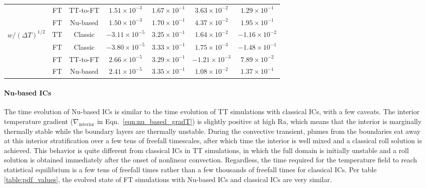\documentclass[aps, pre, onecolumn, nofootinbib, notitlepage, groupedaddress, amsfonts, amssymb, amsmath, longbibliography, superscriptaddress]{revtex4-1}
\newcommand{\grad}{\ensuremath{\nabla}}
\newcommand{\ea}[1]{{\color{red} #1}}
\begin{document}
\begin{table}[b!]
\begin{center}
\begin{tabular}{c c c c c c c}
						&	FT	& TT-to-FT	&	$1.51 \times 10^{-3}$	&	$1.67 \times 10^{-1}$	&	$3.63 \times 10^{-2}$	&	$1.29  \times 10^{-1}$ \\
						&	FT	& Nu-based	&	$1.50 \times 10^{-3}$	&	$1.70 \times 10^{-1}$	&	$4.37 \times 10^{-2}$	&	$1.95  \times 10^{-1}$ \\
\hline                                                                                                                    
$w/(\Delta T)^{1/2}$ 	&	TT	& Classic	&	$-3.11 \times 10^{-5}$	&	$3.25 \times 10^{-1}$	&	$1.64 \times 10^{-2}$	&	$-1.16 \times 10^{-2}$ \\
						&	FT	& Classic	&	$-3.80 \times 10^{-5}$	&	$3.33 \times 10^{-1}$	&	$1.75 \times 10^{-3}$	&	$-1.48 \times 10^{-1}$ \\
						&	FT	& TT-to-FT	&	$2.66  \times 10^{-5}$	&	$3.29 \times 10^{-1}$	&	$-1.21 \times 10^{-3}$	&	$7.89  \times 10^{-2}$ \\
						&	FT	& Nu-based	&	$2.41  \times 10^{-5}$	&	$3.35 \times 10^{-1}$	&	$1.08 \times 10^{-2}$	&	$1.37  \times 10^{-1}$ \\
\hline																	
\end{tabular}
\end{center}
\end{table}


\ea{
\paragraph{Nu-based ICs}
The time evolution of Nu-based ICs is similar to the time evolution of TT simulations with classical ICs, with a few caveats.
The interior temperature gradient ($\grad_{\text{interior}}$ in Eqn.~\ref{eqn:nu_based_gradT}) is slightly positive at high Ra, which means that the interior is marginally thermally stable while the boundary layers are thermally unstable.
During the convective transient, plumes from the boundaries eat away at this interior stratification over a few tens of freefall timescales, after which time the interior is well mixed and a classical roll solution is achieved.
This behavior is quite different from classical ICs in TT simulations, in which the full domain is initially unstable and a roll solution is obtained immediately after the onset of nonlinear convection.
Regardless, the time required for the temperature field to reach statistical equilibrium is a few tens of freefall times rather than a few thousands of freefall times for classical ICs.
Per table \ref{table:pdf_values}, the evolved state of FT simulations with Nu-based ICs and classical ICs are very similar.
}
\end{document}
